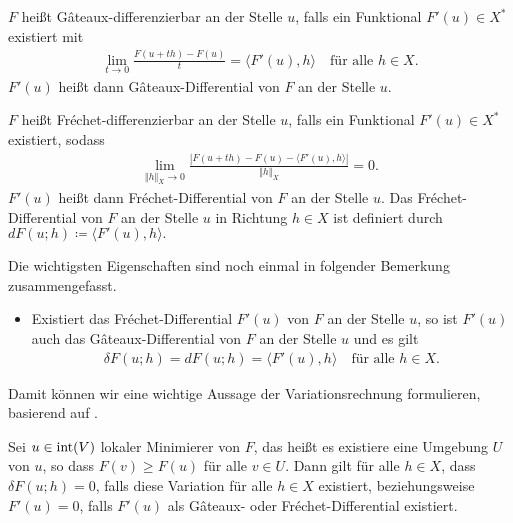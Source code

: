 \begin{definition}
  $F$ heißt G\^ateaux-differenzierbar an der Stelle $u$, falls ein 
  Funktional $F'(u)\in X^\ast$ existiert mit 
  \begin{align*}
    \lim_{t\to 0}\frac{F(u+th)-F(u)}{t} = \langle F'(u), h\rangle\quad
    \text{für alle } h\in X.
  \end{align*}
  $F'(u)$ heißt dann G\^ateaux-Differential von $F$ an der Stelle $u$.

  $F$ heißt Fr\'echet-differenzierbar an der Stelle $u$, falls ein Funktional
  $F'(u)\in X^\ast$ existiert, sodass
  \begin{align*}
    \lim_{\Vert h\Vert_X\to 0}\frac{|F(u+th)-F(u)-
    \langle F'(u),h\rangle|}{\Vert h\Vert_X} =0.
  \end{align*}
  $F'(u)$ heißt dann Fr\'echet-Differential von $F$ an der Stelle $u$.
  Das Fr\'echet-Differential von $F$ an der Stelle $u$ in Richtung $h\in X$
  ist definiert durch $dF(u;h)\coloneq \langle F'(u),h\rangle.$
\end{definition}

Die wichtigsten Eigenschaften sind noch einmal in folgender Bemerkung 
zusammengefasst.

\begin{remark}
  \begin{itemize}
    \item Existiert das Fr\'echet-Differential $F'(u)$ von $F$ an der Stelle
      $u$, so ist $F'(u)$ auch das G\^ateaux-Differential von $F$ an der Stelle
      $u$ und es gilt 
      \begin{align*}
        \delta F(u;h)=dF(u;h)=\langle F'(u),h\rangle\quad\text{für alle } h\in
        X.
      \end{align*}
  \end{itemize}
\end{remark}

Damit können wir eine wichtige Aussage der Variationsrechnung formulieren,
basierend auf \cite[S. 193ff., Theorem 40.A, Theorem 40.B]{Zei85}.

\begin{theorem}
  \label{thm:necessaryConditionFreeLocalExtrema}
  Sei $u\in \operatorname{int}(V)$ lokaler Minimierer von $F$, das heißt
  es existiere eine Umgebung 
  $U$ von $u$, so dass $F(v)\geq F(u)$ für alle $v\in U$. Dann gilt für alle
  $h\in X$, dass $\delta F(u;h) = 0$, falls diese Variation für alle $h\in X$
  existiert, beziehungsweise $F'(u) = 0$, falls $F'(u)$ als 
  G\^ateaux- oder Fr\'echet-Differential existiert.
\end{theorem}

